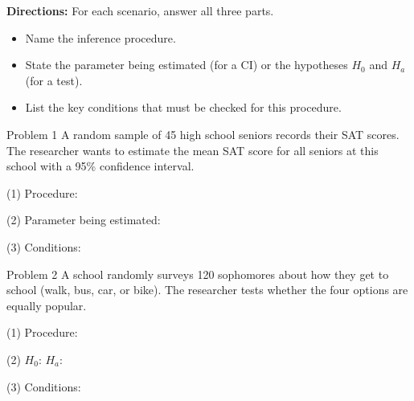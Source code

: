 \documentclass[10pt]{article}
\begin{document}
\namedateperiod

\vspace{0.1in}

\textbf{Directions:} For each scenario, answer all three parts.
\begin{itemize}[noitemsep]
  \item[(1)] Name the inference procedure.
  \item[(2)] State the parameter being estimated (for a CI) or the hypotheses $H_0$ and $H_a$ (for a test).
  \item[(3)] List the key conditions that must be checked for this procedure.
\end{itemize}

\begin{notesbox}{Problem 1}
A random sample of 45 high school seniors records their SAT scores. The researcher wants
to estimate the mean SAT score for all seniors at this school with a 95\% confidence interval.

\vspace{0.08in}
(1) Procedure: 

\vspace{0.08in}
(2) Parameter being estimated: 

\vspace{0.08in}
(3) Conditions: 
\end{notesbox}

\begin{notesbox}{Problem 2}
A school randomly surveys 120 sophomores about how they get to school (walk, bus, car, or
bike). The researcher tests whether the four options are equally popular.

\vspace{0.08in}
(1) Procedure: 

\vspace{0.08in}
(2) $H_0$: 
$H_a$: 

\vspace{0.08in}
(3) Conditions: 
\end{notesbox}
\end{document}
